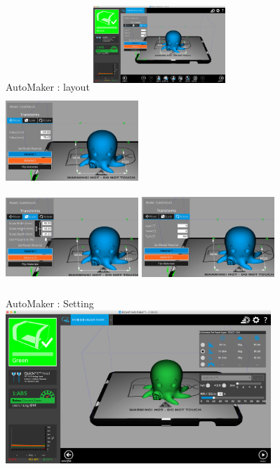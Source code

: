 \documentclass[11pt]{beamer}
\begin{document}
\begin{frame}[t]{AutoMaker : layout}\footnotesize
\centering
\includegraphics[width=5cm, height=3.5cm]{./image/17_20.png} \@ \includegraphics[width=5cm, height=3.5cm]{./image/17_17.png}\\
\includegraphics[width=5cm, height=3.5cm]{./image/17_18.png} \@ \includegraphics[width=5cm, height=3.5cm]{./image/17_19.png}
\end{frame}

\begin{frame}[t]{AutoMaker : Setting}\footnotesize
\centering
\includegraphics[width=10cm]{./image/17_21.png}
\end{frame}
\end{document}
